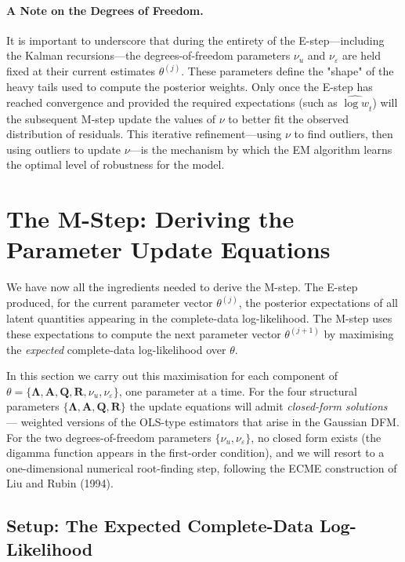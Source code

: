 \documentclass[11pt, a4paper, oneside]{article}
\newcommand{\mL}{\boldsymbol{\Lambda}}
\newcommand{\mA}{\mathbf{A}}
\newcommand{\mR}{\mathbf{R}}
\newcommand{\mQ}{\mathbf{Q}}
\begin{document}
\paragraph{A Note on the Degrees of Freedom.}
It is important to underscore that during the entirety of the E-step—including the Kalman recursions—the degrees-of-freedom parameters $\nu_u$ and $\nu_\varepsilon$ are held fixed at their current estimates $\theta^{(j)}$. 
These parameters define the "shape" of the heavy tails used to compute the posterior weights. 
Only once the E-step has reached convergence and provided the required expectations (such as $\widehat{\log w}_t$) will the subsequent M-step update the values of $\nu$ to better fit the observed distribution of residuals. 
This iterative refinement—using $\nu$ to find outliers, then using outliers to update $\nu$—is the mechanism by which the EM algorithm learns the optimal level of robustness for the model.

\section{The M-Step: Deriving the Parameter Update Equations}
\label{sec:m-step}

We have now all the ingredients needed to derive the M-step. The
E-step produced, for the current parameter
vector $\theta^{(j)}$, the posterior expectations of all latent
quantities appearing in the complete-data log-likelihood. The M-step
uses these expectations to compute the next parameter vector
$\theta^{(j+1)}$ by maximising the \emph{expected} complete-data
log-likelihood over $\theta$.

In this section we carry out this maximisation for each component of
$\theta = \{\mL, \mA, \mQ, \mR, \nu_u, \nu_\varepsilon\}$,
one parameter at a time. For the four structural parameters
$\{\mL, \mathbf{A}, \mathbf{Q}, \mathbf{R}\}$ the update
equations will admit \emph{closed-form solutions} — weighted versions
of the OLS-type estimators that arise in the Gaussian DFM. For the
two degrees-of-freedom parameters $\{\nu_u, \nu_\varepsilon\}$, no
closed form exists (the digamma function appears in the first-order
condition), and we will resort to a one-dimensional numerical
root-finding step, following the ECME construction of Liu and Rubin
(1994).

\subsection{Setup: The Expected Complete-Data Log-Likelihood}
\label{subsec:m-setup}
\end{document}
